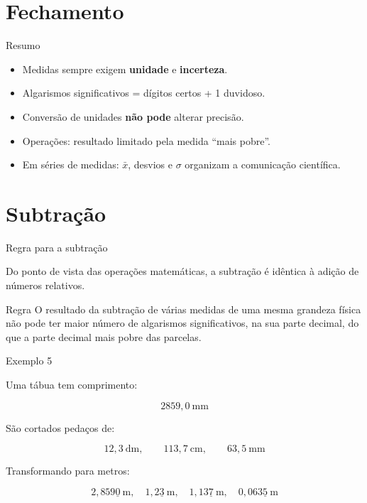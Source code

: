 \documentclass[aspectratio=169,10pt]{beamer}
\begin{document}
\section{Fechamento}

\begin{frame}{Resumo}
\begin{itemize}
  \item Medidas sempre exigem \textbf{unidade} e \textbf{incerteza}.
  \item Algarismos significativos = dígitos certos + 1 duvidoso.
  \item Conversão de unidades \textbf{não pode} alterar precisão.
  \item Operações: resultado limitado pela medida “mais pobre”.
  \item Em séries de medidas: \(\bar{x}\), desvios e \(\sigma\) organizam a comunicação científica.
\end{itemize}
\end{frame}

\section{Subtração}

\begin{frame}{Regra para a subtração}

Do ponto de vista das operações matemáticas, a subtração é idêntica à
adição de números relativos.

\begin{block}{Regra}
O resultado da subtração de várias medidas de uma mesma grandeza física
não pode ter maior número de algarismos significativos, na sua parte
decimal, do que a parte decimal mais pobre das parcelas.
\end{block}

\end{frame}


\begin{frame}{Exemplo 5}

Uma tábua tem comprimento:

\[
2859,0 \ \text{mm}
\]

São cortados pedaços de:

\[
12,3\ \text{dm},\qquad
113,7\ \text{cm},\qquad
63,5\ \text{mm}
\]

Transformando para metros:

\[
2,859\underline{0}\ \text{m},\quad
1,2\underline{3}\ \text{m},\quad
1,13\underline{7}\ \text{m},\quad
0,063\underline{5}\ \text{m}
\]

\end{frame}
\end{document}
